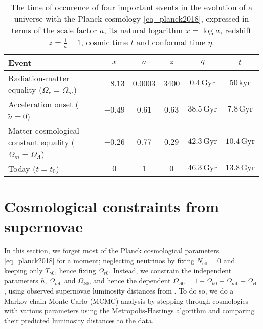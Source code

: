 \documentclass[10pt,a4paper]{article}
\begin{document}
\begin{table}
\centering
\caption{%
	The time of occurence of four important events in the evolution of a universe with the Planck cosmology \eqref{eq_planck2018},
	expressed in terms of the scale factor $a$, its natural logarithm $x = \log a$, redshift $z = \frac1a - 1$, cosmic time $t$ and conformal time $\eta$.
}
\label{table_times1}
\begin{tabular}{l c c c c c}
	\toprule
	Event                                                               & $x$     & $a$       & $z$    & $\eta$    & $t$ \\
	\midrule
	Radiation-matter equality ($\Omega_r = \Omega_m$)                   & $-8.13$ & $0.0003$  & $3400$ & $0.4\,\mathrm{Gyr}$ & $50\,\mathrm{kyr}$ \\
	Acceleration onset ($\ddot{a} = 0$)                                 & $-0.49$ & $0.61$    & $0.63$ & $38.5\,\mathrm{Gyr}$ & $7.8\,\mathrm{Gyr}$   \\
	Matter-cosmological constant equality ($\Omega_m = \Omega_\Lambda$) & $-0.26$ & $0.77$    & $0.29$ & $42.3\,\mathrm{Gyr}$ & $10.4\,\mathrm{Gyr}$  \\
	Today ($t = t_0$)                                                   & $0$     & $1$       & $0$    & $46.3\,\mathrm{Gyr}$ & $13.8\,\mathrm{Gyr}$  \\
	\bottomrule
\end{tabular}
\end{table}

\clearpage

\section{Cosmological constraints from supernovae}
\label{sec_supernova}

In this section, we forget most of the Planck cosmological parameters \eqref{eq_planck2018} for a moment;
neglecting neutrinos by fixing $N_\text{eff}=0$ and keeping only $T_{\gamma0}$, hence fixing $\Omega_{r0}$.
Instead, we constrain the independent parameters $h$, $\Omega_{m0}$ and $\Omega_{k0}$,
and hence the dependent $\Omega_{\Lambda 0}=1-\Omega_{k0}-\Omega_{m0}-\Omega_{r0}$,
using observed supernovae luminosity distances from \cite{betouleImprovedCosmologicalConstraints2014}.
To do so, we do a Markov chain Monte Carlo (MCMC) analysis
by stepping through cosmologies with various parameters using the Metropolis-Hastings algorithm
and comparing their predicted luminosity distances to the data.
\end{document}
